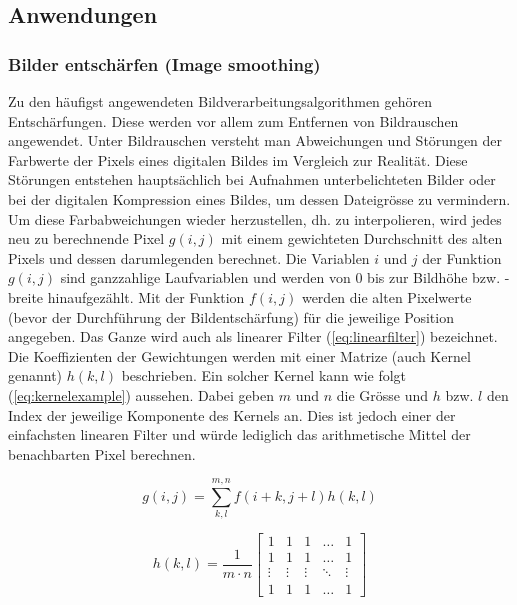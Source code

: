 \subsection{Anwendungen}

\subsubsection{Bilder entschärfen (Image smoothing)}

Zu den häufigst angewendeten Bildverarbeitungsalgorithmen gehören Entschärfungen. Diese werden vor allem zum Entfernen von Bildrauschen angewendet. Unter Bildrauschen versteht man Abweichungen und Störungen der Farbwerte der Pixels eines digitalen Bildes im Vergleich zur Realität. Diese Störungen entstehen hauptsächlich bei Aufnahmen unterbelichteten Bilder oder bei der digitalen Kompression eines Bildes, um dessen Dateigrösse zu vermindern. Um diese Farbabweichungen wieder herzustellen, dh. zu interpolieren, wird jedes neu zu berechnende Pixel $g(i,j)$ mit einem gewichteten Durchschnitt des alten Pixels und dessen darumlegenden berechnet. Die Variablen $i$ und $j$ der Funktion $g(i,j)$ sind ganzzahlige Laufvariablen und werden von $0$ bis zur Bildhöhe bzw. -breite hinaufgezählt. Mit der Funktion $f(i,j)$ werden die alten Pixelwerte (bevor der Durchführung der Bildentschärfung) für die jeweilige Position angegeben. Das Ganze wird auch als linearer Filter (\ref{eq:linearfilter}) bezeichnet. Die Koeffizienten der Gewichtungen werden mit einer Matrize (auch Kernel genannt) $h(k,l)$ beschrieben. Ein solcher Kernel kann wie folgt (\ref{eq:kernelexample}) aussehen. Dabei geben $m$ und $n$ die Grösse  und $h$ bzw. $l$ den Index der jeweilige Komponente des Kernels an. Dies ist jedoch einer der einfachsten linearen Filter und würde lediglich das arithmetische Mittel der benachbarten Pixel berechnen.  \cite{opencv_bradski_kaehler:1, opencv_doc_blur:1}

\begin{equation}
	g(i,j) = \sum_{k,l}^{m,n} f(i+k,j+l)h(k,l)
	\label{eq:linearfilter}
\end{equation}
\cite{opencv_doc_blur:1}



\begin{equation}
	h(k,l) = \frac{1}{m \cdot n}
	\begin{bmatrix}
  	1      & 1      & 1      & \dots  &      1 \\
	1      & 1      & 1      & \dots  &      1 \\
	 \vdots & \vdots & \vdots & \ddots & \vdots \\
	 1      & 1      & 1      & \dots  &      1
	\end{bmatrix}	
	\label{eq:kernelexample}
\end{equation}
\cite{opencv_doc_blur:1}

